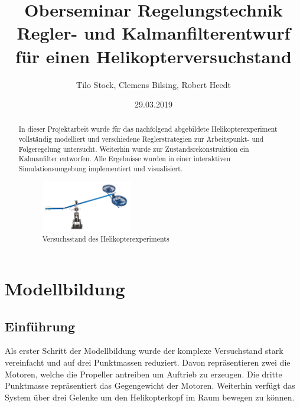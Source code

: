 \documentclass[times, 10pt,twocolumn]{article}
\begin{document}
	\title{Oberseminar Regelungstechnik \\ Regler- und Kalmanfilterentwurf f\"ur einen 					Helikopterversuchstand}
	\author{Tilo Stock, Clemens Bilsing, Robert Heedt}
	\date {29.03.2019}

	\maketitle
	\thispagestyle{empty}
	
	\renewcommand\abstractname{Zusammenfassung}
	\begin{abstract}
		In dieser Projektarbeit wurde für das nachfolgend abgebildete Helikopterexperiment vollständig modelliert und verschiedene Reglerstrategien zur Arbeitspunkt- und Folgeregelung untersucht. Weiterhin wurde zur Zustandsrekonstruktion ein Kalmanfilter entworfen. Alle Ergebnisse wurden in einer interaktiven Simulationsumgebung implementiert und visualisiert.

		\begin{figure}[ht]
			\centering
			\includegraphics[width=0.4\textwidth]{images/Versuchstand}
			\caption{Versuchsstand des Helikopterexperiments}
			\label{Versuchstand}
		\end{figure}
	\end{abstract}
	
	\section{Modellbildung}
	\subsection{Einführung}

	Als erster Schritt der Modellbildung wurde der komplexe Versuchstand stark vereinfacht und auf drei Punktmassen reduziert. Davon repräsentieren zwei die Motoren, welche die Propeller antreiben um Auftrieb zu erzeugen. Die dritte Punktmasse repräsentiert das Gegengewicht der Motoren. Weiterhin verfügt das System über drei Gelenke um den Helikopterkopf im Raum bewegen zu können.
\end{document}
